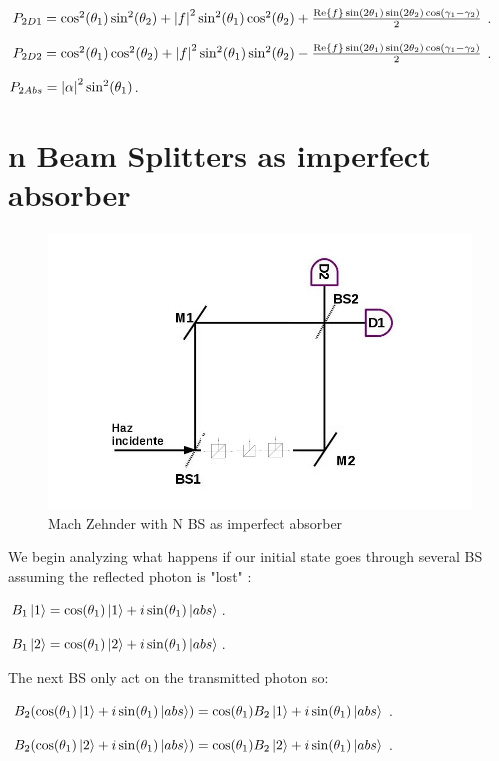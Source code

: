 \documentclass[11pt]{article}
\begin{document}
\vspace{5cm}
$P_{2D1}=\cos^2(\theta_{1})\sin^2(\theta_{2})+\abs{f}^2 \sin^2(\theta_{1})\cos^2(\theta_{2})+\frac{\Re{f} \sin(2\theta_{1})\sin(2\theta_{2})\cos(\gamma_{1}-\gamma_{2})}{2}$.

$P_{2D2}=\cos^2(\theta_{1})\cos^2(\theta_{2})+ \abs{f}^2 \sin^2(\theta_{1})\sin^2(\theta_{2})-\frac{\Re{f} \sin(2\theta_{1})\sin(2\theta_{2})\cos(\gamma_{1}-\gamma_{2})}{2}$.

$P_{2Abs}=\abs{\alpha}^2 \sin^2(\theta_{1})$.


\section{n Beam Splitters as imperfect absorber }
\vspace{1 cm}
\begin{figure}[h!]
\centering
\includegraphics[width=\linewidth]{machzenhderBSS.jpg}
\caption{Mach Zehnder with N BS as imperfect absorber}
\label{fig:BS2}
\end{figure}

We begin analyzing what happens if our initial state goes through several BS assuming the reflected photon is "lost" :


$B_{1}\ket{1}=\cos(\theta_{1})\ket{1}+i\sin(\theta_{1})\ket{abs}$.

$B_{1}\ket{2}=\cos(\theta_{1})\ket{2}+i\sin(\theta_{1})\ket{abs}$.

The next BS only act on the transmitted photon so:

$B_{2}(\cos(\theta_{1})\ket{1}+i\sin(\theta_{1})\ket{abs})=\cos(\theta_{1})B_{2}\ket{1}+i\sin(\theta_{1})\ket{abs}$.

$B_{2}(\cos(\theta_{1})\ket{2}+i\sin(\theta_{1})\ket{abs})=\cos(\theta_{1})B_{2}\ket{2}+i\sin(\theta_{1})\ket{abs}$.
\end{document}
